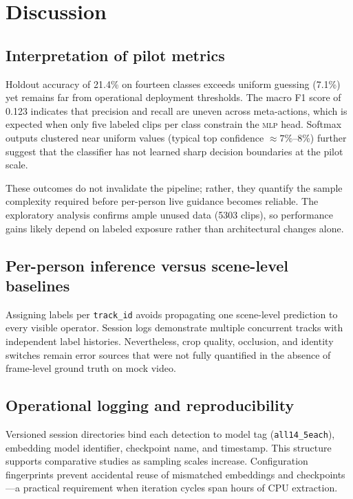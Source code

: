\section{Discussion}
\label{sec:discussion}

\subsection{Interpretation of pilot metrics}

Holdout accuracy of \num{21.4}\% on fourteen classes exceeds uniform guessing (\num{7.1}\%) yet remains far from operational deployment thresholds.
The macro F1 score of \num{0.123} indicates that precision and recall are uneven across meta-actions, which is expected when only five labeled clips per class constrain the \textsc{mlp} head.
Softmax outputs clustered near uniform values (typical top confidence $\approx\num{7}\%$--\num{8}\%) further suggest that the classifier has not learned sharp decision boundaries at the pilot scale.

These outcomes do not invalidate the pipeline; rather, they quantify the sample complexity required before per-person live guidance becomes reliable.
The exploratory analysis confirms ample unused data (\num{5303} clips), so performance gains likely depend on labeled exposure rather than architectural changes alone.

\subsection{Per-person inference versus scene-level baselines}

Assigning labels per \texttt{track\_id} avoids propagating one scene-level prediction to every visible operator.
Session logs demonstrate multiple concurrent tracks with independent label histories.
Nevertheless, crop quality, occlusion, and identity switches remain error sources that were not fully quantified in the absence of frame-level ground truth on mock video.

\subsection{Operational logging and reproducibility}

Versioned session directories bind each detection to model tag (\texttt{all14\_5each}), embedding model identifier, checkpoint name, and timestamp.
This structure supports comparative studies as sampling scales increase.
Configuration fingerprints prevent accidental reuse of mismatched embeddings and checkpoints---a practical requirement when iteration cycles span hours of CPU extraction.

